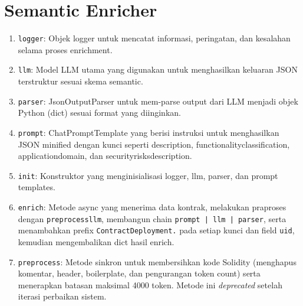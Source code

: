 \chapter{Semantic Enricher}
\label{appendix:semantic-enricher}

\begin{enumerate}
	\item \texttt{logger}: Objek logger untuk mencatat informasi, peringatan, dan kesalahan selama proses enrichment.
	\item \texttt{llm}: Model LLM utama yang digunakan untuk menghasilkan keluaran JSON terstruktur sesuai skema semantic.
	\item \texttt{parser}: JsonOutputParser untuk mem-parse output dari LLM menjadi objek Python (dict) sesuai format yang diinginkan.
	\item \texttt{prompt}: ChatPromptTemplate yang berisi instruksi untuk menghasilkan JSON minified dengan kunci seperti description, functionality\textunderscore classification, application\textunderscore domain, dan security\textunderscore risks\textunderscore description.
	\item \texttt{\textunderscore init\textunderscore }: Konstruktor yang menginisialisasi logger, llm, parser, dan prompt templates.
	\item \texttt{enrich}: Metode async yang menerima data kontrak, melakukan praproses dengan \texttt{preprocess\textunderscore llm}, membangun chain \texttt{prompt | llm | parser}, serta menambahkan prefix \texttt{ContractDeployment.} pada setiap kunci dan field \texttt{uid}, kemudian mengembalikan dict hasil enrich.
	\item \texttt{preprocess}: Metode sinkron untuk membersihkan kode Solidity (menghapus komentar, header, boilerplate, dan pengurangan token count) serta menerapkan batasan maksimal 4000 token. Metode ini \textit{deprecated} setelah iterasi perbaikan sistem.
\end{enumerate}
